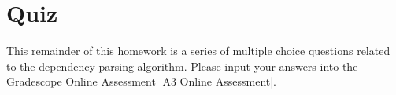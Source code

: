 \section{Quiz}

This remainder of this homework is a series of multiple choice questions related to the dependency parsing algorithm. Please input your answers into the Gradescope Online Assessment |A3 Online Assessment|.






